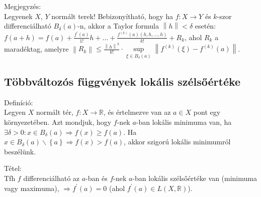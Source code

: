 \documentclass[12pt,a4paper]{scrartcl}
\newenvironment{definicio}{}{}
\newenvironment{tetel}{}{}
\newenvironment{megjegyzes}{}{}
\begin{document}
\begin{megjegyzes}

Megjegyzés:\\
Legyenek \(X\), \(Y\) normált terek! Bebizonyítható, hogy ha
\(\left. f:X\rightarrow Y \right.\) és \(k\)-szor differenciálható
\(B_{\delta}\left( a \right)\)-n, akkor a Taylor formula
\(\left\| h \right\| < \delta\) esetén:
\(f\left( {a + h} \right) = f\left( a \right) + \frac{f^{\prime}\left( a \right)}{1!}h + ... + \frac{f^{(k)}\left( a \right)\left( {h,h,...,h} \right)}{k!} + R_{k}\),
ahol \(R_{k}\) a maradéktag, amelyre
\(\left\| R_{k} \right\| \leq \frac{\left\| h \right\|^{k}}{k!} \cdot \sup\limits_{\xi \in B_{\delta}{(a)}}\left\| {f^{(k)}\left( \xi \right) - f^{(k)}\left( a \right)} \right\|\).

\end{megjegyzes}

\hypertarget{tobbvaltozos-fuggvenyek-lokalis-szelsoerteke}{%
\subsection{Többváltozós függvények lokális
szélsőértéke}\label{tobbvaltozos-fuggvenyek-lokalis-szelsoerteke}}

\begin{definicio}

Definíció:\\
Legyen \(X\) normált tér, \(\left. f:X\rightarrow{\mathbb{R}} \right.\),
és értelmezve van az \(a \in X\) pont egy környezetében. Azt mondjuk,
hogy \(f\)-nek \(a\)-ban lokális minimuma van, ha
\(\left. \exists\delta > 0:x \in B_{\delta}\left( a \right)\Rightarrow f\left( x \right) \geq f\left( a \right) \right.\).
Ha
\(\left. x \in B_{\delta}\left( a \right)\backslash\left\{ a \right\}\Rightarrow f\left( x \right) > f\left( a \right) \right.\),
akkor szigorú lokális minimumról beszélünk.

\end{definicio}

\begin{tetel}

Tétel:\\
Tfh \(f\) differenciálható az \(a\)-ban és \(f\)-nek \(a\)-ban lokális
szélsőértéke van (minimuma vagy maximuma),
\(\left. \Rightarrow f^{\prime}\left( a \right) = 0 \right.\) (ahol
\(f^{\prime}\left( a \right) \in L\left( {X,{\mathbb{R}}} \right)\)).

\end{tetel}
\end{document}
